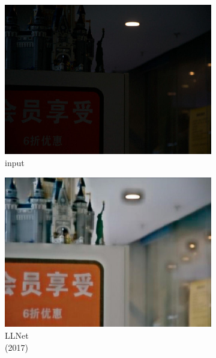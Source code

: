 \documentclass[a4paper]{ctexart}
\begin{document}
	\begin{figure}[htbp]
		\centering
		\begin{subfigure}{0.17\columnwidth}
			\includegraphics[width=\linewidth]{picture/LLIE/VE-LOL-L/input}
			\captionsetup{font=scriptsize}
			\caption*{input \\ \quad }
			\label{fig: input}
		\end{subfigure}
		\begin{subfigure}{0.17\columnwidth}
			\includegraphics[width=\linewidth]{picture/LLIE/VE-LOL-L/LLNet}
			\captionsetup{font=scriptsize}
			\caption*{LLNet \\ (2017)}
			\label{fig: LLNet_VE_LOL}	
		\end{subfigure}
		\begin{subfigure}{0.17\columnwidth}

\end{subfigure}
\end{figure}
\end{document}
